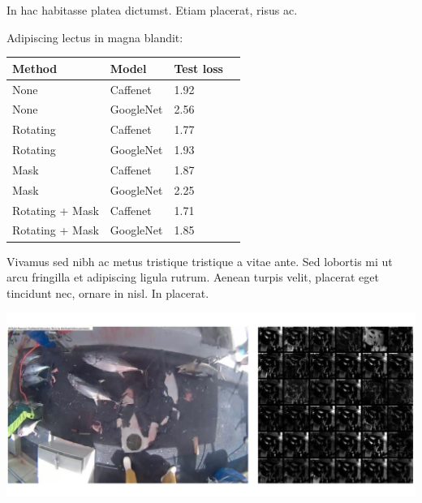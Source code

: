 \documentclass[a0,portrait]{a0poster}
\begin{document}
\begin{multicols}{2}
In hac habitasse platea dictumst. Etiam placerat, risus ac.

Adipiscing lectus in magna blandit:

\begin{center}\vspace{1cm}
\begin{tabular}{l l l l}
\toprule
\textbf{Method} & \textbf{Model} & \textbf{Test loss} \\
\midrule
	None	& Caffenet	& 1.92 \\
       None	& GoogleNet	& 2.56 \\
       Rotating & Caffenet     & 1.77  \\
       Rotating & GoogleNet   & 1.93    \\
	Mask	& Caffenet	& 1.87   \\
	Mask	& GoogleNet	& 2.25    \\
	Rotating + Mask &Caffenet & 1.71   \\
	Rotating + Mask &GoogleNet & 1.85  \\
\bottomrule
\end{tabular}
\end{center}\vspace{1cm}

Vivamus sed nibh ac metus tristique tristique a vitae ante. Sed lobortis mi ut arcu fringilla et adipiscing ligula rutrum. Aenean turpis velit, placerat eget tincidunt nec, ornare in nisl. In placerat.

\begin{center}\vspace{1cm}
\includegraphics[width=0.8\linewidth]{merge}
\end{center}\vspace{1cm}


\end{multicols}
\end{document}
